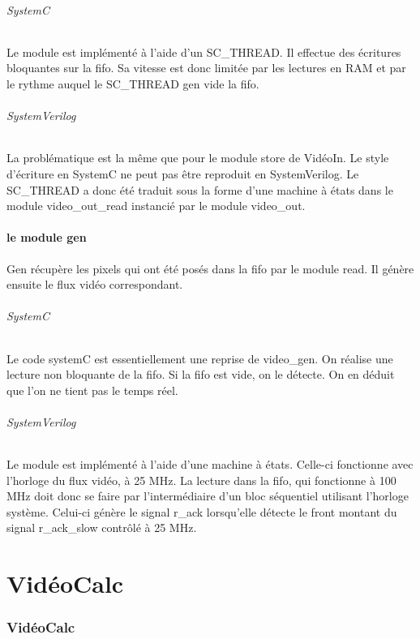 \documentclass[a4paper,12pt]{report}
\begin{document}
\paragraph{SystemC}
Le module est implémenté à l'aide d'un SC\_THREAD.
Il effectue des écritures bloquantes sur la fifo. 
Sa vitesse est donc limitée par les lectures en RAM et
par le rythme auquel le SC\_THREAD gen vide la fifo.

\paragraph{SystemVerilog}
La problématique est la même que pour le module store de VidéoIn. 
Le style d'écriture en SystemC ne peut pas être reproduit en SystemVerilog.
Le SC\_THREAD a donc été traduit sous la forme d'une machine à états dans le module video\_out\_read instancié par le module video\_out.

\subsection{le module gen}
Gen récupère les pixels qui ont été posés dans la fifo par le module read.
Il génère ensuite le flux vidéo correspondant.

\paragraph{SystemC}
Le code systemC est essentiellement une reprise de video\_gen.
On réalise une lecture non bloquante de la fifo. 
Si la fifo est vide, on le détecte. 
On en déduit que l'on ne tient pas le temps réel.

\paragraph{SystemVerilog}
Le module est implémenté à l'aide d'une machine à états.
Celle-ci fonctionne avec l'horloge du flux vidéo, à 25 MHz.
La lecture dans la fifo, qui fonctionne à 100 MHz doit donc se faire
par l'intermédiaire d'un bloc séquentiel utilisant l'horloge système.
Celui-ci génère le signal r\_ack lorsqu'elle détecte le front montant
du signal r\_ack\_slow contrôlé à 25 MHz.






    \part{VidéoCalc} 
    \section*{VidéoCalc}
\end{document}
